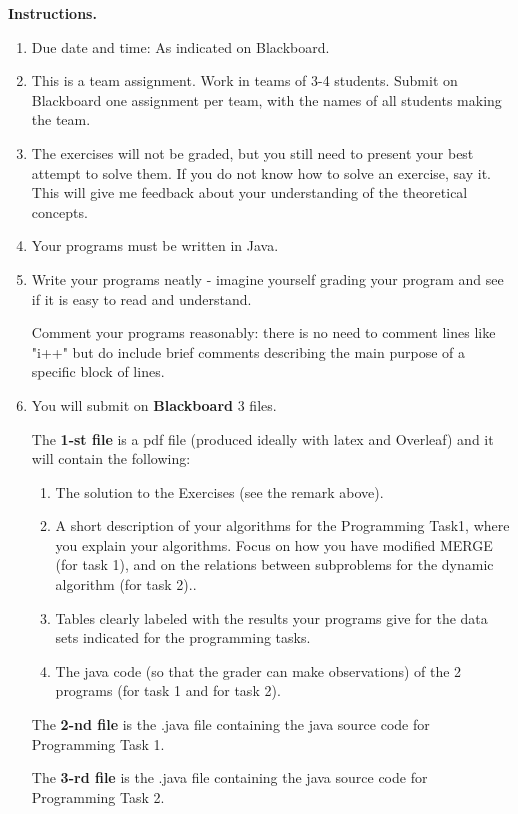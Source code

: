 \documentclass[11pt]{article}
\begin{document}
\vline


\textbf{Instructions.}
\begin{enumerate}
\item Due date and time: As indicated on Blackboard. 
\item This is a team assignment. Work in teams of 3-4 students.  Submit on Blackboard one assignment per team, with the names of all students making the team. 
\item The exercises will not be graded, but you still need to present your best attempt to solve them. If you do not know how to solve an exercise, say it.  This will give me feedback about your understanding of the theoretical concepts.
\item Your programs must be written in Java.

\item Write your programs neatly - imagine yourself grading your program and see if it is easy to read and understand. 

Comment your programs reasonably: there is no need to comment lines like "i++" but do include brief comments describing the main purpose of a specific block of lines.
\item  You will submit on \textbf{Blackboard} 3 files.  

The \textbf{1-st file} is a pdf file (produced ideally with latex and Overleaf) and it will contain the following:
\begin{enumerate}
\item The solution to the Exercises (see the remark above).
\item   A short description of your algorithms for the Programming Task1, where you explain your algorithms. Focus on how you have modified MERGE (for task 1), and on the relations between subproblems for the dynamic algorithm (for task 2)..
\item    Tables clearly labeled with the results your programs give for the data sets indicated for the programming tasks. 
\item   The java code (so that the grader can make observations) of the  2 programs (for task 1 and for task 2).
\end{enumerate}


The \textbf{2-nd file} is the .java file containing the java source code for Programming Task 1.


The \textbf{3-rd file} is the .java file containing the java source code for Programming Task 2.
\end{enumerate}
\newpage
\end{document}
